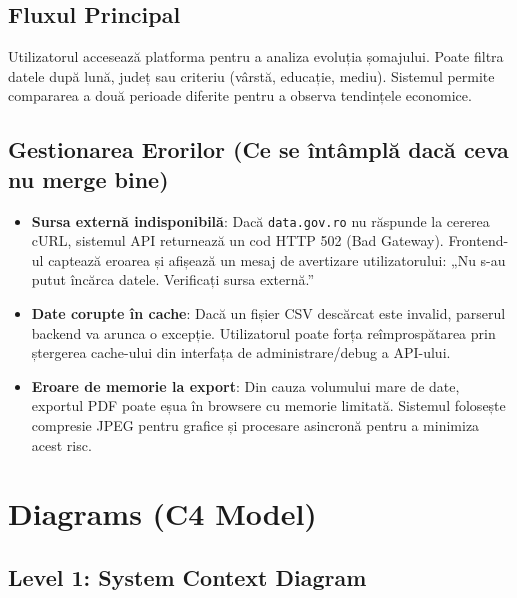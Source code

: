 \documentclass[12pt,a4paper]{article}
\begin{document}
\subsection{Fluxul Principal}
Utilizatorul accesează platforma pentru a analiza evoluția șomajului. Poate filtra datele după lună, județ sau criteriu (vârstă, educație, mediu). Sistemul permite compararea a două perioade diferite pentru a observa tendințele economice.

\subsection{Gestionarea Erorilor (Ce se întâmplă dacă ceva nu merge bine)}
\begin{itemize}
    \item \textbf{Sursa externă indisponibilă}: Dacă \texttt{data.gov.ro} nu răspunde la cererea cURL, sistemul API returnează un cod HTTP 502 (Bad Gateway). Frontend-ul captează eroarea și afișează un mesaj de avertizare utilizatorului: „Nu s-au putut încărca datele. Verificați sursa externă.”
    \item \textbf{Date corupte în cache}: Dacă un fișier CSV descărcat este invalid, parserul backend va arunca o excepție. Utilizatorul poate forța reîmprospătarea prin ștergerea cache-ului din interfața de administrare/debug a API-ului.
    \item \textbf{Eroare de memorie la export}: Din cauza volumului mare de date, exportul PDF poate eșua în browsere cu memorie limitată. Sistemul folosește compresie JPEG pentru grafice și procesare asincronă pentru a minimiza acest risc.
\end{itemize}

\section{Diagrams (C4 Model)}

\subsection{Level 1: System Context Diagram}
\begin{center}
\end{center}
\end{document}
